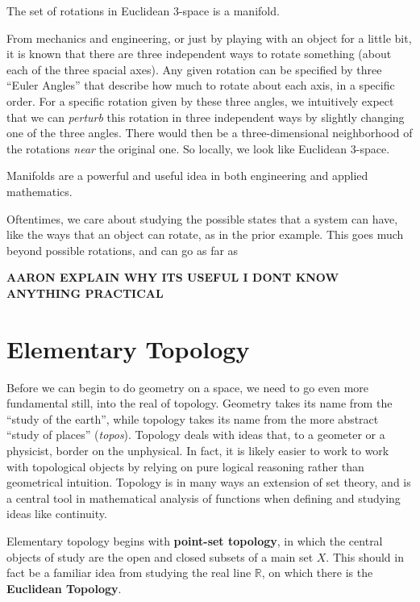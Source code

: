 	\begin{example}\label{ex:SO_n}
		The set of rotations in Euclidean $3$-space is a manifold. 
	\end{example}
	From mechanics and engineering, or just by playing with an object for a little bit, it is known that there are three independent ways to rotate something (about each of the three spacial axes). Any given rotation can be specified by three ``Euler Angles'' that describe how much to rotate about each axis, in a specific order. For a specific rotation given by these three angles, we intuitively expect that we can \emph{perturb} this rotation in three independent ways by slightly changing one of the three angles. There would then be a three-dimensional neighborhood of the rotations \emph{near} the original one. So locally, we look like Euclidean 3-space. 
	
	\begin{prop}
		Manifolds are a powerful and useful idea in both engineering and applied mathematics.
	\end{prop}
	Oftentimes, we care about studying the possible states that a system can have, like the ways that an object can rotate, as in the prior example. This goes much beyond possible rotations, and can go as far as 
	
	\textbf{AARON EXPLAIN WHY ITS USEFUL I DONT KNOW ANYTHING PRACTICAL}
	
	
	
	\section{Elementary Topology} %
	\label{sec:elementary_topology}
	
	
	Before we can begin to do geometry on a space, we need to go even more fundamental still, into the real of topology. Geometry takes its name from the ``study of the earth'', while topology takes its name from the more abstract ``study of places'' (\emph{topos}). Topology deals with ideas that, to a geometer or a physicist, border on the unphysical. In fact, it is likely easier to work to work with topological objects by relying on pure logical reasoning rather than geometrical intuition. Topology is in many ways an extension of set theory, and is a central tool in mathematical analysis of functions when defining and studying ideas like continuity.
	
	Elementary topology begins with \textbf{point-set topology}, in which the central objects of study are the open and closed subsets of a main set $X$. This should in fact be a familiar idea from studying the real line $\mathbb{R}$, on which there is the \textbf{Euclidean Topology}.
	
